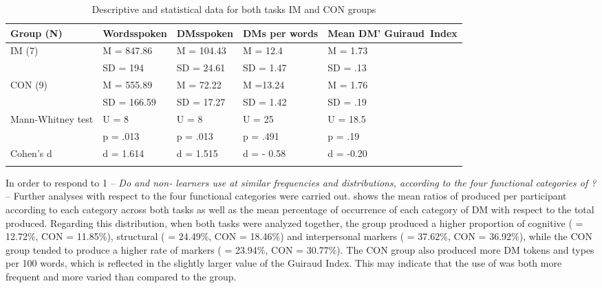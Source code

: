 \documentclass[output=paper]{langsci/langscibook}
\begin{document}
\begin{table} 
 
\caption{\label{tab:ament:6} Descriptive and statistical data for both tasks IM and CON groups}
\begin{tabularx}{\textwidth}{l Q@{~}p{18mm}p{18mm}Q}
\lsptoprule
\bfseries Group (N) & \bfseries Words\newline spoken & \bfseries {DMs}\newline spoken & \bfseries {DMs} per words & \bfseries Mean DM’ 
\mbox{Guiraud Index}\\
\midrule
{{{IM} (7)}} & {M = 847.86} & M = 104.43  & M = 12.4  & {M = 1.73}\\
             & SD = 194     &  SD = 24.61 & SD = 1.47 & SD = .13\\

{CON (9)} & M = 555.89  & M = 72.22   & M =13.24  & {M = 1.76}\\
	  & SD = 166.59 &  SD = 17.27 & SD = 1.42 & SD = .19\\

\mbox{Mann-Whitney} test& {U = 8}  & {U = 8}  & {U = 25} & {U = 18.5} \\
		        & p = .013 & p = .013 & p = .491 & p = .19\\

{Cohen’s d} & d = 1.614 & d = 1.515 & d = - 0.58 & d = -0.20\\
\lspbottomrule
\end{tabularx}
\end{table}


In order to respond to  1 – \textit{Do  and non- learners use  at similar frequencies and distributions, according to the four functional categories of ?} – Further analyses with respect to the four functional categories were carried out.  shows the mean ratios of  produced per participant according to each category across both tasks as well as the mean percentage of occurrence of each category of DM with respect to the total  produced. Regarding this distribution, when both tasks were analyzed together, the  group produced a higher proportion of cognitive ( = 12.72\%, CON = 11.85\%), structural ( = 24.49\%, CON = 18.46\%) and interpersonal markers ( = 37.62\%, CON = 36.92\%), while the CON group tended to produce a higher rate of  markers ( = 23.94\%, CON = 30.77\%). The CON group also produced more DM tokens and types per 100 words, which is reflected in the slightly larger value of the Guiraud Index. This may indicate that the use of  was both more frequent and more varied than compared to the  group.
\end{document}
